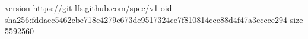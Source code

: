 version https://git-lfs.github.com/spec/v1
oid sha256:fddaec5462cbe718c4279c673de9517324ce7f810814ccc88d4f47a3cccce294
size 5592560

